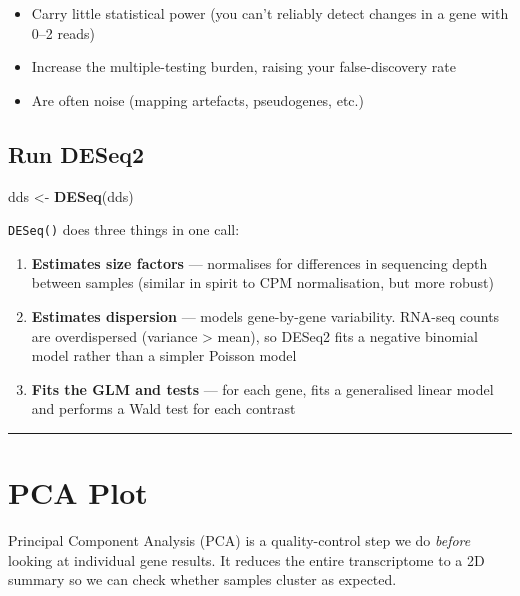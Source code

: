 \documentclass[
]{article}
\newenvironment{Shaded}{\begin{snugshade}}{\end{snugshade}}
\newcommand{\FunctionTok}[1]{\textcolor[rgb]{0.13,0.29,0.53}{\textbf{#1}}}
\newcommand{\NormalTok}[1]{#1}
\newcommand{\OtherTok}[1]{\textcolor[rgb]{0.56,0.35,0.01}{#1}}
\providecommand{\tightlist}{%
  \setlength{\itemsep}{0pt}\setlength{\parskip}{0pt}}
\begin{document}
\begin{itemize}
\tightlist
\item
  Carry little statistical power (you can't reliably detect changes in a
  gene with 0--2 reads)
\item
  Increase the multiple-testing burden, raising your false-discovery
  rate
\item
  Are often noise (mapping artefacts, pseudogenes, etc.)
\end{itemize}

\subsection{Run DESeq2}\label{run-deseq2}

\begin{Shaded}
\begin{Highlighting}[]
\NormalTok{dds }\OtherTok{\textless{}{-}} \FunctionTok{DESeq}\NormalTok{(dds)}
\end{Highlighting}
\end{Shaded}

\texttt{DESeq()} does three things in one call:

\begin{enumerate}
\def\labelenumi{\arabic{enumi}.}
\tightlist
\item
  \textbf{Estimates size factors} --- normalises for differences in
  sequencing depth between samples (similar in spirit to CPM
  normalisation, but more robust)
\item
  \textbf{Estimates dispersion} --- models gene-by-gene variability.
  RNA-seq counts are overdispersed (variance \textgreater{} mean), so
  DESeq2 fits a negative binomial model rather than a simpler Poisson
  model
\item
  \textbf{Fits the GLM and tests} --- for each gene, fits a generalised
  linear model and performs a Wald test for each contrast
\end{enumerate}

\begin{center}\rule{0.5\linewidth}{0.5pt}\end{center}

\section{PCA Plot}\label{pca-plot}

Principal Component Analysis (PCA) is a quality-control step we do
\emph{before} looking at individual gene results. It reduces the entire
transcriptome to a 2D summary so we can check whether samples cluster as
expected.
\end{document}
